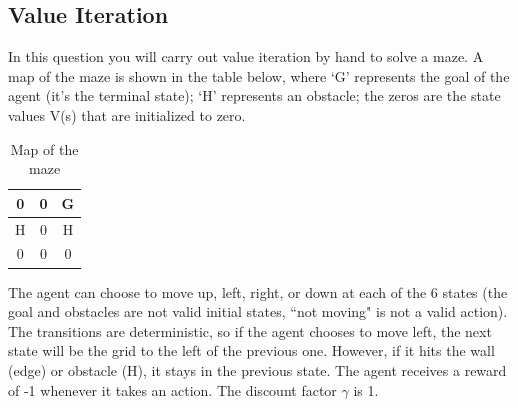 \subsection{Value Iteration }

In this question you will carry out value iteration by hand to solve a maze. A map of the maze is shown in the table below, where `G' represents the goal of the agent (it's the terminal state); `H' represents an obstacle; the zeros are the state values V(s) that are initialized to zero.

\begin{table}[H]
\begin{center}
  \begin{tabular}{ | c | c | c | }
    \hline
    0 & 0 & G\\ \hline
    H & 0 & H \\ \hline
    0 & 0 & 0 \\ \hline
  \end{tabular}
 \caption{Map of the maze}
\end{center}
\end{table}

The agent can choose to move up, left, right, or down at each of the 6 states (the goal and obstacles are not valid initial states, ``not moving" is not a valid action). The transitions are deterministic, so if the agent chooses to move left, the next state will be the grid to the left of the previous one. However, if it hits the wall (edge) or obstacle (H), it stays in the previous state. The agent receives a reward of -1 whenever it takes an action. The discount factor $\gamma$ is 1.
 
